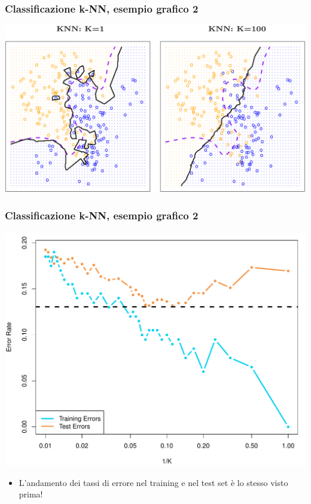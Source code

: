 \begin{frame}
	\frametitle{Classificazione k-NN, esempio grafico 2}
	\begin{center}
		\includegraphics[width=1.0\linewidth]{images/supervised/knn_classification/knn_classification_example_3.png}
	\end{center}
\end{frame}


\begin{frame}
	\frametitle{Classificazione k-NN, esempio grafico 2}

	\begin{center}
		\includegraphics[scale=0.4]{images/supervised/knn_classification/2_17.pdf}
	\end{center}

	\begin{itemize}
		\item L'andamento dei tassi di errore nel training e nel test set è lo stesso visto prima!
	\end{itemize}
\end{frame}

